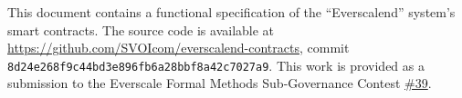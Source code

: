 
This document contains a functional specification of the ``Everscalend'' system's smart contracts. The source code is available at \url{https://github.com/SVOIcom/everscalend-contracts}, commit \verb+8d24e268f9c44bd3e896fb6a28bbf8a42c7027a9+. This work is provided as a submission to the Everscale Formal Methods Sub-Governance Contest \href{https://formet.gov.freeton.org/proposal?proposalAddress=0\%3A222afd84a41bb8c70517d692d0a4a28c42898b1d3520279a86878202f5730a0f}{\#39}.
